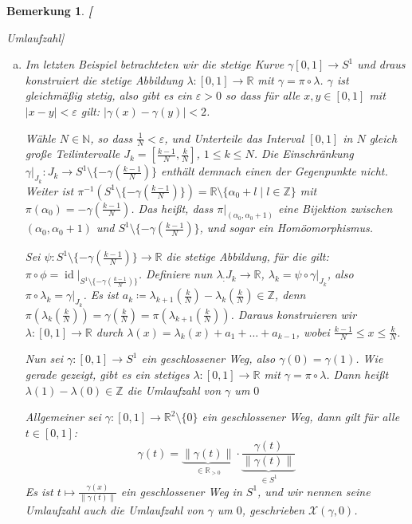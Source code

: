\documentclass[12pt]{scrbook}   %
\newtheorem{bemX}[alles]{Bemerkung}
\newenvironment{bem}[1]{\begin{bemX}{\bf #1}\par\rm}{\end{bemX}}
\newcommand{\da}{\coloneqq}
\begin{document}
\begin{bem}[Umlaufzahl]
\begin{enumerate}[a)]
\item 
Im letzten Beispiel betrachteten wir die stetige Kurve $\gamma[0,1]\to S^1$ und draus konstruiert die stetige Abbildung $\lambda : [0,1]\to \mathbb R$ mit $\gamma = \pi \circ \lambda$. $\gamma$ ist gleichmäßig stetig, also gibt es ein $\varepsilon>0$ so dass für alle $x,y\in[0,1]$ mit $|x-y|<\varepsilon$ gilt: $|\gamma(x)-\gamma(y)|<2$.

Wähle $N\in \mathbb N$, so dass $\frac1N<\varepsilon$, und Unterteile das Interval $[0,1]$ in $N$ gleich große Teilintervalle $J_k=[\frac{k-1}N,\frac kN]$, $1\le k\le N$. Die Einschränkung $\gamma|_{J_k} : J_k \to S^1 \setminus \{-\gamma(\frac{k-1}N)\}$ enthält demnach einen der Gegenpunkte nicht. Weiter ist $\pi^{-1}(S^1\setminus \{-\gamma(\frac{k-1}N)\})=\mathbb R \setminus \{\alpha_0 + l \mid l\in \mathbb Z\}$ mit $\pi(\alpha_0) = -\gamma(\frac{k-1}N)$. Das heißt, dass $\pi|_{(\alpha_0,\alpha_0+1)}$ eine Bijektion zwischen $(\alpha_0,\alpha_0+1)$ und $S^1 \setminus \{-\gamma(\frac{k-1}N)\}$, und sogar ein Homöomorphismus.

Sei $\psi:S^1\setminus \{-\gamma(\frac{k-1}N)\}\to \mathbb R$ die stetige Abbildung, für die gilt: $\pi\circ \phi = \operatorname{id}|_{S^1\setminus \{-\gamma(\frac{k-1}N)\}}$. Definiere nun $\lambda_:J_k\to \mathbb R$, $\lambda_k = \psi\circ\gamma|_{J_k}$, also $\pi \circ \lambda_k = \gamma|_{J_k}$. Es ist $a_k\da \lambda_{k+1}(\frac kN) - \lambda_k(\frac kN) \in \mathbb Z$, denn $\pi(\lambda_k(\frac kN)) = \gamma(\frac kN) = \pi(\lambda_{k+1}(\frac kN))$. Daraus konstruieren wir $\lambda : [0,1]\to \mathbb R$ durch $\lambda(x)= \lambda_k(x)+a_1+\ldots+a_{k-1}$, wobei $\frac {k-1}N\le x\le \frac{k}N$.

Nun sei $\gamma:[0,1]\to S^1$ ein geschlossener Weg, also $\gamma(0)=\gamma(1)$. Wie gerade gezeigt, gibt es ein stetiges $\lambda:[0,1]\to \mathbb R$ mit $\gamma = \pi \circ \lambda$. Dann heißt $\lambda(1)-\lambda(0)\in\mathbb Z$ die \emph{Umlaufzahl} von $\gamma$ um $0$

Allgemeiner sei $\gamma:[0,1]\to \mathbb R^2\setminus\{0\}$ ein geschlossener Weg, dann gilt für alle $t\in [0,1]$:
\[
\gamma(t) = \underbrace{\|\gamma(t)\|}_{\in \mathbb R_{>0}} \cdot \underbrace{\frac{\gamma(t)}{\|\gamma(t)\|}}_{\in S^1}
\]
Es ist $t\mapsto \frac{\gamma(x)}{\|\gamma(t)\|}$ ein geschlossener Weg in $S^1$, und wir nennen seine Umlaufzahl auch die \emph{Umlaufzahl} von $\gamma$ um $0$, geschrieben $\mathcal X(\gamma,0)$.


\end{enumerate}
\end{bem}
\end{document}
